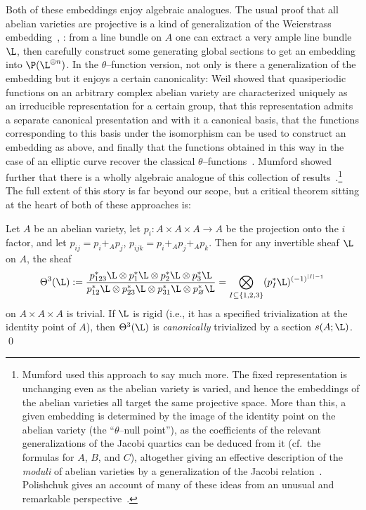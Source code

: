 Both of these embeddings enjoy algebraic analogues.  The usual proof that all abelian varieties are projective is a kind of generalization of the Weierstrass embedding~\cite[Section I.6]{Milne}, \cite[Remark II.7.8.2]{Hartshorne}: from a line bundle on \(A\) one can extract a very ample line bundle \(\L\), then carefully construct some generating global sections to get an embedding into \(\P(\L^{\oplus n})\).  In the \(\theta\)--function version, not only is there a generalization of the embedding but it enjoys a certain canonicality: Weil showed that quasiperiodic functions on an arbitrary complex abelian variety are characterized uniquely as an irreducible representation for a certain group, that this representation admits a separate canonical presentation and with it a canonical basis, that the functions corresponding to this basis under the isomorphism can be used to construct an embedding as above, and finally that the functions obtained in this way in the case of an elliptic curve recover the classical $\theta$--functions~\cite{WeilTheta,Cartier}.  Mumford showed further that there is a wholly algebraic analogue of this collection of results~\cite{MumfordEquationsI,Tate}.\footnote{Mumford used this approach to say much more.  The fixed representation is unchanging even as the abelian variety is varied, and hence the embeddings of the abelian varieties all target the same projective space.  More than this, a given embedding is determined by the image of the identity point on the abelian variety (the ``$\theta$--null point''), as the coefficients of the relevant generalizations of the Jacobi quartics can be deduced from it (cf.\ the formulas for $A$, $B$, and $C$), altogether giving an effective description of the \emph{moduli} of abelian varieties by a generalization of the Jacobi relation~\cite{MumfordEquationsII,MumfordEquationsIII}.  Polishchuk gives an account of many of these ideas from an unusual and remarkable perspective~\cite{Polishchuk}.}  The full extent of this story is far beyond our scope, but a critical theorem sitting at the heart of both of these approaches is:
\begin{theorem}\label{Theta3IsTrivial}
Let \(A\) be an abelian variety, let \(p_i: A \times A \times A \to A\) be the projection onto the \(i\){\th} factor, and let \(p_{ij} = p_i +_A p_j\), \(p_{ijk} = p_i +_A p_j +_A p_k\).  Then for any invertible sheaf \(\L\) on \(A\), the sheaf \[\Theta^3(\L) := \frac{p_{123}^* \L \otimes p_1^* \L \otimes p_2^* \L \otimes p_3^* \L}{p_{12}^* \L \otimes p_{23}^* \L \otimes p_{31}^* \L \otimes p_\emptyset^* \L} = \bigotimes_{I \subseteq \{1, 2, 3\}} (p_I^* \L)^{(-1)^{|I| - 1}}\] on \(A \times A \times A\) is trivial.  If \(\L\) is rigid (i.e., it has a specified trivialization at the identity point of \(A\)), then \(\Theta^3(\L)\) is \emph{canonically} trivialized by a section \(s(A; \L)\). \qed
\end{theorem}

